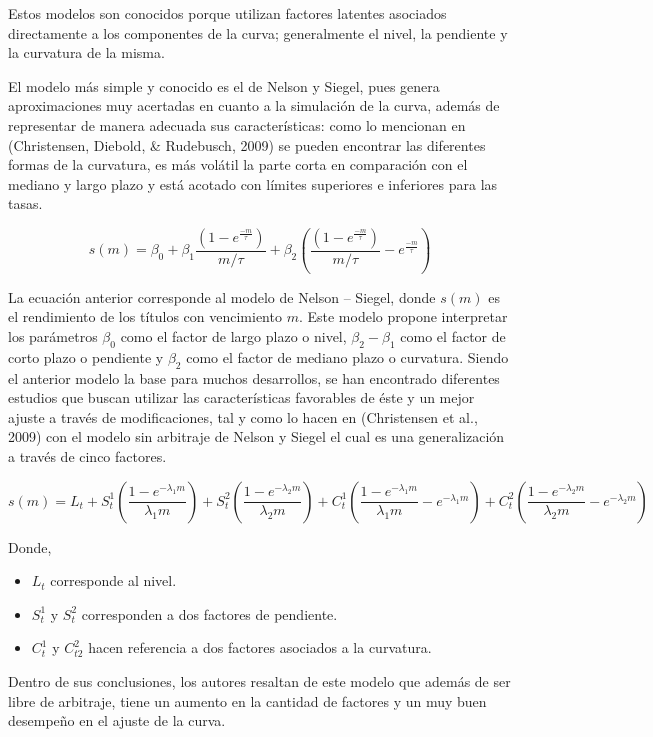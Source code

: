 \documentclass[
  12pt,
]{krantz}
\providecommand{\tightlist}{%
  \setlength{\itemsep}{0pt}\setlength{\parskip}{0pt}}
\begin{document}
Estos modelos son conocidos porque utilizan factores latentes asociados directamente a los componentes de la curva; generalmente el nivel, la pendiente y la curvatura de la misma.

El modelo más simple y conocido es el de Nelson y Siegel, pues genera aproximaciones muy acertadas en cuanto a la simulación de la curva, además de representar de manera adecuada sus características: como lo mencionan en (Christensen, Diebold, \& Rudebusch, 2009) se pueden encontrar las diferentes formas de la curvatura, es más volátil la parte corta en comparación con el mediano y largo plazo y está acotado con límites superiores e inferiores para las tasas.

\[\displaystyle{s(m) = \beta_{0}+ \beta_{1}\frac{\left(1-e^\frac{-m}{\tau}\right)}{m/\tau} + \beta_{2} \left(\frac{\left(1-e^\frac{-m}{\tau}\right)}{m/\tau} -  e^\frac{-m}{\tau}\right)}\]

La ecuación anterior corresponde al modelo de Nelson -- Siegel, donde \(s(m)\) es el rendimiento de los títulos con vencimiento \(m\). Este modelo propone interpretar los parámetros \(\beta_0\) como el factor de largo plazo o nivel, \(\beta_2-\beta_1\) como el factor de corto plazo o pendiente y \(\beta_2\) como el factor de mediano plazo o curvatura. Siendo el anterior modelo la base para muchos desarrollos, se han encontrado diferentes estudios que buscan utilizar las características favorables de éste y un mejor ajuste a través de modificaciones, tal y como lo hacen en (Christensen et al., 2009) con el modelo sin arbitraje de Nelson y Siegel el cual es una generalización a través de cinco factores.

\[\displaystyle{s(m) = L_t + S_{t}^{1}(\frac{1-e^{-\lambda_1 m}}{\lambda_1 m})+S_{t}^{2}(\frac{1-e^{-\lambda_2 m}}{\lambda_2 m})+C_{t}^{1}(\frac{1-e^{-\lambda_1 m}}{\lambda_1 m}-e^{-\lambda_1 m})+C_{t}^{2}(\frac{1-e^{-\lambda_2 m}}{\lambda_2 m}-e^{-\lambda_2 m})}\]

Donde,

\begin{itemize}
\tightlist
\item
  \(L_t\) corresponde al nivel.
\item
  \(S_{t}^{1}\) y \(S_{t}^{2}\) corresponden a dos factores de pendiente.
\item
  \(C_{t}^{1}\) y \(C_{t2}^{2}\) hacen referencia a dos factores asociados a la curvatura.
\end{itemize}

Dentro de sus conclusiones, los autores resaltan de este modelo que además de ser libre de arbitraje, tiene un aumento en la cantidad de factores y un muy buen desempeño en el ajuste de la curva.
\end{document}
